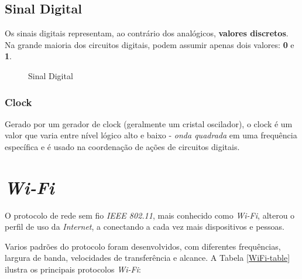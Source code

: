 \documentclass[
	11pt,				%
	openright,			%
	twoside,			%
	a5paper,			%
	english,			%
	french,				%
	spanish,			%
	brazil,				%
	sumario=tradicional
]{abntex2}
\begin{document}
   
    
\subsection{Sinal Digital}
    Os sinais digitais representam, ao contrário dos analógicos, \textbf{\textsf{valores discretos}}. Na grande maioria dos circuitos digitais, podem assumir apenas dois valores: \textbf{\textbf{0}} e \textbf{\textbf{1}}.
   \begin{figure}[ht]
    \centering
    \label{Sinal-Digital}
    \caption{Sinal Digital}
    \end{figure}

\subsubsection{Clock}
Gerado por um gerador de clock (geralmente um cristal oscilador), o clock é um valor que varia entre nível lógico alto e baixo - \textit{onda quadrada} em uma frequência específica e é usado na coordenação de ações de circuitos digitais.

\section{\textit{Wi-Fi}}

O protocolo de rede sem fio \textit{IEEE 802.11}, mais conhecido como \textit{Wi-Fi}, alterou o perfil de uso da \textit{Internet}, a conectando a cada vez mais dispositivos e pessoas.

Varios padrões do protocolo foram desenvolvidos, com diferentes frequências, largura de banda, velocidades de transferência e alcance. A Tabela \ref{WiFi-table} ilustra os principais protocolos \textit{Wi-Fi}:
 
\end{document}
